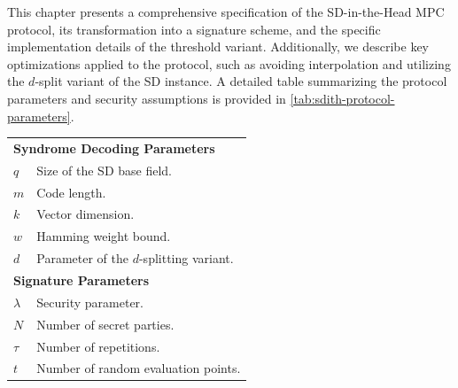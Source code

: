 \documentclass[11pt]{report}
\theoremstyle{definition}
\theoremstyle{plain}
\begin{document}
This chapter presents a comprehensive specification of the SD-in-the-Head MPC protocol, its transformation into a signature scheme, and the specific implementation details of the threshold variant. Additionally, we describe key optimizations applied to the protocol, such as avoiding interpolation and utilizing the $d$-split variant of the SD instance. A detailed table summarizing the protocol parameters and security assumptions is provided in \autoref{tab:sdith-protocol-parameters}.

\begin{table}[]
  \begin{tabular}{p{}p{}}
    \hline
    \multicolumn{2}{l}{\textbf{Syndrome Decoding Parameters}}                                                                             \\
    $q$                          & Size of the SD base field.                                                                             \\
    $m$                          & Code length.                                                                                           \\
    $k$                          & Vector dimension.                                                                                      \\
    $w$                          & Hamming weight bound.                                                                                  \\
    $d$                          & Parameter of the $d$-splitting variant.                                                                \\ \hline

    \multicolumn{2}{l}{\textbf{Signature Parameters}}                                                                                     \\
    $\lambda$                    & Security parameter.                                                                                    \\
    $N$                          & Number of secret parties.                                                                              \\
    $\tau$                       & Number of repetitions.                                                                                 \\
    $t$                          & Number of random evaluation points.                                                                    \\ \hline


\end{tabular}
\end{table}
\end{document}
